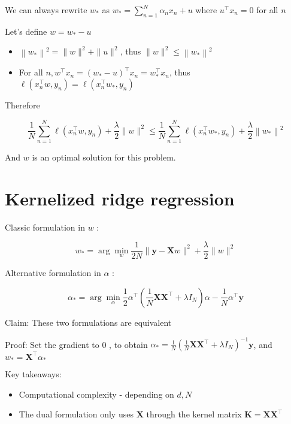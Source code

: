 We can always rewrite $w_{*}$ as $w_{*}=\sum_{n=1}^{N} \alpha_{n} x_{n}+u$ where $u^{\top} x_{n}=0$ for all $n$

Let's define $w=w_{*}-u$

\begin{itemize}
  \item $\left\|w_{*}\right\|^{2}=\|w\|^{2}+\|u\|^{2}$, thus $\|w\|^{2} \leq\left\|w_{*}\right\|^{2}$

  \item For all $n, w^{\top} x_{n}=\left(w_{*}-u\right)^{\top} x_{n}=w_{*}^{\top} x_{n}$, thus $\ell\left(x_{n}^{\top} w, y_{n}\right)=\ell\left(x_{n}^{\top} w_{*}, y_{n}\right)$

\end{itemize}

Therefore

$$
\frac{1}{N} \sum_{n=1}^{N} \ell\left(x_{n}^{\top} w, y_{n}\right)+\frac{\lambda}{2}\|w\|^{2} \leq \frac{1}{N} \sum_{n=1}^{N} \ell\left(x_{n}^{\top} w_{*}, y_{n}\right)+\frac{\lambda}{2}\left\|w_{*}\right\|^{2}
$$

And $w$ is an optimal solution for this problem.

\section*{Kernelized ridge regression}
Classic formulation in $w$ :

$$
w_{*}=\arg \min _{w} \frac{1}{2 N}\|\mathbf{y}-\mathbf{X} w\|^{2}+\frac{\lambda}{2}\|w\|^{2}
$$

Alternative formulation in $\alpha$ :

$$
\alpha_{*}=\arg \min _{\alpha} \frac{1}{2} \alpha^{\top}\left(\frac{1}{N} \mathbf{X} \mathbf{X}^{\top}+\lambda I_{N}\right) \alpha-\frac{1}{N} \alpha^{\top} \mathbf{y}
$$

Claim: These two formulations are equivalent

Proof: Set the gradient to 0 , to obtain $\alpha_{*}=\frac{1}{N}\left(\frac{1}{N} \mathbf{X} \mathbf{X}^{\top}+\lambda I_{N}\right)^{-1} \mathbf{y}$, and $w_{*}=\mathbf{X}^{\top} \alpha_{*}$

Key takeaways:

\begin{itemize}
  \item Computational complexity - depending on $d, N$
  \item The dual formulation only uses $\mathbf{X}$ through the kernel matrix $\mathbf{K}=\mathbf{X X}^{\top}$
\end{itemize}


